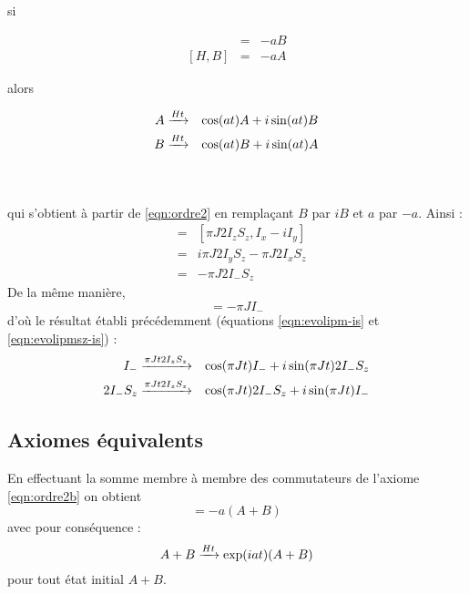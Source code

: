 \noindent
\begin{minipage}{0.5cm}si\end{minipage}
\hfill
\parbox{3.5cm}
{\begin{eqnarray*} [H,A] & = & -aB \\ {[H,B]} & = & -aA \end{eqnarray*}}
\hfill\hfill
\begin{minipage}{0.5cm}alors\end{minipage}
\hfill
\parbox{8cm}{
\begin{eqnarray*}
A & \xrightarrow{Ht} & \cos(at)A + i\sin(at)B \\
B & \xrightarrow{Ht} & \cos(at)B + i\sin(at)A
\end{eqnarray*}}
\parbox{1cm}{\begin{eqnarray}\label{eqn:ordre2b}\end{eqnarray}}
\\
\noindent
qui s'obtient à partir de \ref{eqn:ordre2} en remplaçant $B$ par $iB$
et $a$ par $-a$.
Ainsi :
\begin{eqnarray}
[\pi J 2I_zS_z, I_-] & = & [\pi J 2I_zS_z, I_x - iI_y] \nonumber\\
& = & i\pi J 2I_yS_z - \pi J 2I_xS_z \nonumber\\
& = & -\pi J 2I_-S_z
\end{eqnarray}
De la même manière,
\begin{equation}
[\pi J 2I_zS_z, 2I_-S_z] = -\pi J I_-
\end{equation}
d'où le résultat établi précédemment 
(équations \ref{eqn:evolipm-is} et \ref{eqn:evolipmsz-is}) :
\begin{eqnarray}
\label{eqn:evolim-is}
I_- & \xrightarrow{\pi J t 2I_zS_z} &
\cos(\pi J t)I_- + i \sin(\pi J t) 2I_-S_z \\
2I_-S_z & \xrightarrow{\pi J t 2I_zS_z} &
\cos(\pi J t)2I_-S_z + i \sin(\pi J t) I_-
\end{eqnarray}

\subsection{Axiomes équivalents}
En effectuant la somme membre à membre des commutateurs de
l'axiome \ref{eqn:ordre2b} on obtient
\begin{equation}
[H,A+B] = -a(A+B)
\end{equation}
avec pour conséquence :
\begin{equation}
A+B \xrightarrow{Ht} \exp(iat)(A+B)
\end{equation}
pour tout état initial $A+B$.

